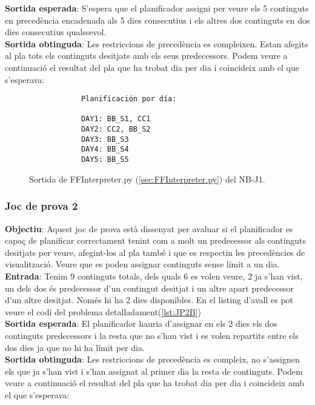 \documentclass[a4paper]{article}
\begin{document}
	\noindent \textbf{Sortida esperada}: S'espera que el planificador assigni per veure els 5 continguts en precedència encadenada als 5 dies consecutius i els altres dos continguts en dos dies consecutius qualssevol. \\
	
	\noindent \textbf{Sortida obtinguda}:  Les restriccions de  precedència es compleixen.  Estan afegits al pla tots els continguts desitjats amb els seus predecessors. Podem veure a continuació el resultat del pla que ha trobat dia per dia i coincideix amb el que s'esperava:
	
	\begin{figure}[H]
		\centering
		\begin{verbatim}
			Planificación por día:
			
			DAY1: BB_S1, CC1
			DAY2: CC2, BB_S2
			DAY3: BB_S3
			DAY4: BB_S4
			DAY5: BB_S5		
		\end{verbatim}
		\caption{Sortida de FFInterpreter.py (\ref{sec:FFInterpreter.py}) del NB-J1.}
	\end{figure}
	
	
	\subsubsection*{Joc de prova 2}
	\noindent \textbf{Objectiu}: Aquest joc de prova està dissenyat per avaluar si el planificador es capaç de planificar correctament tenint com a molt un predecessor als continguts desitjats per veure, afegint-los al pla també i que es respectin les precedències de visualització. Veure que es poden assignar continguts sense límit a un dia. \\
	
	\noindent \textbf{Entrada}: Tenim 9 continguts totals, dels quals 6 es volen veure, 2 ja s'han vist, un dels dos és predecessor d'un contingut desitjat i un altre apart predecessor d'un altre desitjat. Només hi ha 2 dies disponibles. En el listing d'avall es pot veure el codi del problema detalladament(\ref{lst:JP2B}) \\
	
	\noindent \textbf{Sortida esperada}: El planificador hauria d'assignar en els 2 dies els dos continguts predecessors i la resta que no s'han vist i es volen repartits entre els dos dies ja que no hi ha límit per dia. \\
	
	\noindent \textbf{Sortida obtinguda}: Les restriccions de precedència es compleix, no s'assignen els que ja s'han vist i s'han assignat al primer dia la resta de continguts. Podem veure a continuació el resultat del pla que ha trobat dia per dia i coincideix amb el que s'esperava:
	
\end{document}
